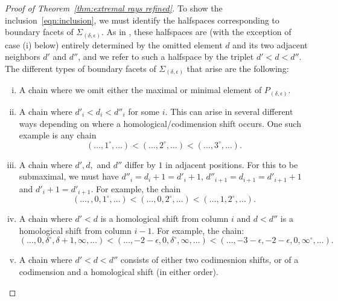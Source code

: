 \documentclass[12pt]{amsart}
\theoremstyle{definition}
\theoremstyle{remark}
\newcommand{\codim}{\operatorname{codim}}
\newcommand{\dd}{d}
\newcommand{\zp}{\circ}
\begin{document}
\begin{proof}[Proof of Theorem~\ref{thm:extremal rays refined}]
To show the inclusion~\eqref{eqn:inclusion}, we must identify the halfspaces corresponding to boundary facets of $\Sigma_{(\delta,\epsilon)}$.  
As in \cite[Proposition~2.12]{boij-sod1}, these halfspaces are (with the exception of case (i) below) entirely determined by the omitted element $\dd$ and its two adjacent neighbors $d'$ and $d''$, and we refer to such a halfspace by the triplet $d'<d<d''$.  The different types of boundary facets of $\Sigma_{(\delta,\epsilon)}$ that arise are the following:
\begin{enumerate}[(i)]
	\item A chain where we omit either the maximal or minimal element of $P_{(\delta,\epsilon)}$.
	\item A chain where $d'_i<d_i<d''_i$ for some $i$.  This can arise in several different ways depending on where a homological/codimension shift occurs.
	One such example is any chain
	\[
(\dots,1^\zp,\dots) <(\dots, 2^\zp,\dots) <(\dots,3^\zp,\dots).
	\]
%
	\item A chain where $d', d,$ and $d''$ differ by $1$ in adjacent positions.  For this to be submaximal, we must have $d''_i=d_i+1=d'_i+1$, $d''_{i+1}=d_{i+1}=d'_{i+1}+1$ and $d'_i+1=d'_{i+1}$.  For example, the chain
			\[
(\dots,, 0,1^\zp,\dots) <(\dots, 0,2^\zp,\dots) <(\dots, 1,2^\zp,\dots) .
			\]
	\item A chain where $d'<d$ is a homological shift from column $i$ and $d<d''$ is a homological shift from column $i-1$.  For example, the chain:
		\[
		(\dots, 0,\delta^\zp,\delta+1,\infty,\dots)<(\dots, -2-\epsilon,0,\delta^\zp,\infty,\dots)<(\dots, -3-\epsilon,-2-\epsilon,0,\infty^\zp,\dots).
		\]
	\item A chain where $d'<d<d''$ consists of either two codimesnion shifts, or of a codimension and a homological shift (in either order).

\end{enumerate}
\end{proof}
\end{document}
